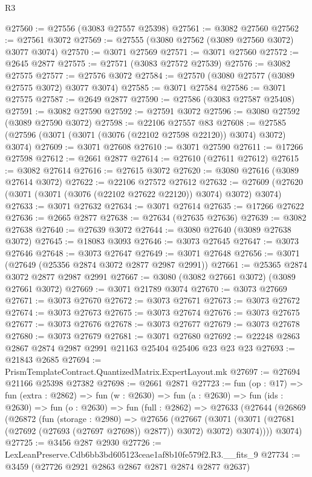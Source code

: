 \begin{lexlean}{R3}
\begin{coremodule}
@27560 := @27556 (@3083 @27557 @25398)
@27561 := @3082 @27560
@27562 := @27561 @3072
@27569 := @27555 (@3080 @27562 (@3089 @27560 @3072) @3077 @3074)
@27570 := @3071 @27569
@27571 := @3071 @27560
@27572 := @2645 @2877
@27575 := @27571 (@3083 @27572 @27539)
@27576 := @3082 @27575
@27577 := @27576 @3072
@27584 := @27570 (@3080 @27577 (@3089 @27575 @3072) @3077 @3074)
@27585 := @3071 @27584
@27586 := @3071 @27575
@27587 := @2649 @2877
@27590 := @27586 (@3083 @27587 @25408)
@27591 := @3082 @27590
@27592 := @27591 @3072
@27596 := @3080 @27592 (@3089 @27590 @3072)
@27598 := @22106 @27557 @83
@27608 := @27585 (@27596 (@3071 (@3071 (@3076 (@22102 @27598 @22120)) @3074) @3072) @3074)
@27609 := @3071 @27608
@27610 := @3071 @27590
@27611 := @17266 @27598
@27612 := @2661 @2877
@27614 := @27610 (@27611 @27612)
@27615 := @3082 @27614
@27616 := @27615 @3072
@27620 := @3080 @27616 (@3089 @27614 @3072)
@27622 := @22106 @27572 @27612
@27632 := @27609 (@27620 (@3071 (@3071 (@3076 (@22102 @27622 @22120)) @3074) @3072) @3074)
@27633 := @3071 @27632
@27634 := @3071 @27614
@27635 := @17266 @27622
@27636 := @2665 @2877
@27638 := @27634 (@27635 @27636)
@27639 := @3082 @27638
@27640 := @27639 @3072
@27644 := @3080 @27640 (@3089 @27638 @3072)
@27645 := @18083 @3093
@27646 := @3073 @27645
@27647 := @3073 @27646
@27648 := @3073 @27647
@27649 := @3071 @27648
@27656 := @3071 (@27649 (@25356 @2874 @3072 @2877 @2987 @2991))
@27661 := @25365 @2874 @3072 @2877 @2987 @2991
@27667 := @3080 (@3082 @27661 @3072) (@3089 @27661 @3072)
@27669 := @3071 @21789 @3074
@27670 := @3073 @27669
@27671 := @3073 @27670
@27672 := @3073 @27671
@27673 := @3073 @27672
@27674 := @3073 @27673
@27675 := @3073 @27674
@27676 := @3073 @27675
@27677 := @3073 @27676
@27678 := @3073 @27677
@27679 := @3073 @27678
@27680 := @3073 @27679
@27681 := @3071 @27680
@27692 := @22248 @2863 @2867 @2874 @2987 @2991 @21163 @25404 @25406 @23 @23 @23
@27693 := @21843 @2685
@27694 := PrismTemplateContract.QuantizedMatrix.ExpertLayout.mk
@27697 := @27694 @21166 @25398 @27382
@27698 := @2661 @2871
@27723 := fun (op : @17) =>
  fun (extra : @2862) =>
  fun (w : @2630) =>
  fun (a : @2630) =>
  fun (ids : @2630) =>
  fun (o : @2630) =>
  fun (full : @2862) =>
  @27633
    (@27644
      (@26869
        (@26872
          (fun (storage : @2980) =>
          @27656
            (@27667
              (@3071 (@3071 (@27681 (@27692 (@27693 (@27697 @27698)) @2877)) @3072) @3072)
              @3074))))
      @3074)
@27725 := @3456 @287 @2930
@27726 := LexLeanPreserve.Cdb6bb3bd605123ceae1af8b10fe579f2.R3.__fits_9
@27734 := @3459 (@27726 @2921 @2863 @2867 @2871 @2874 @2877 @2637)

\end{coremodule}
\end{lexlean}
